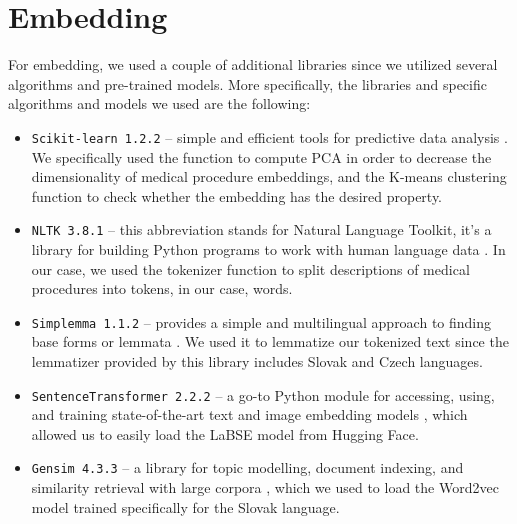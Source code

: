 
\section{Embedding}
\label{embedDesign}

For embedding, we used a couple of additional libraries since we utilized several algorithms and pre-trained models. More specifically, the libraries and specific algorithms and models we used are the following:

\begin{itemize}
	\item \texttt{Scikit-learn 1.2.2} – simple and efficient tools for predictive data analysis \cite{scikitlearn}. We specifically used the function to compute PCA in order to decrease the dimensionality of medical procedure embeddings, and the K-means clustering function to check whether the embedding has the desired property.
	
	\item \texttt{NLTK 3.8.1} – this abbreviation stands for Natural Language Toolkit, it's a library for building Python programs to work with human language data \cite{ntlk}. In our case, we used the tokenizer function to split descriptions of medical procedures into tokens, in our case, words.
	
	\item \texttt{Simplemma 1.1.2} – provides a simple and multilingual approach to finding base forms or lemmata \cite{simplemma}. We used it to lemmatize our tokenized text since the lemmatizer provided by this library includes Slovak and Czech languages.
	
	\item \texttt{SentenceTransformer 2.2.2} – a go-to Python module for accessing, using, and training state-of-the-art text and image embedding models \cite{sentence_transformer}, which allowed us to easily load the LaBSE model from Hugging Face.
	
	\item \texttt{Gensim 4.3.3} – a library for topic modelling, document indexing, and similarity retrieval with large corpora \cite{gensim}, which we used to load the Word2vec model trained specifically for the Slovak language.
\end{itemize}


